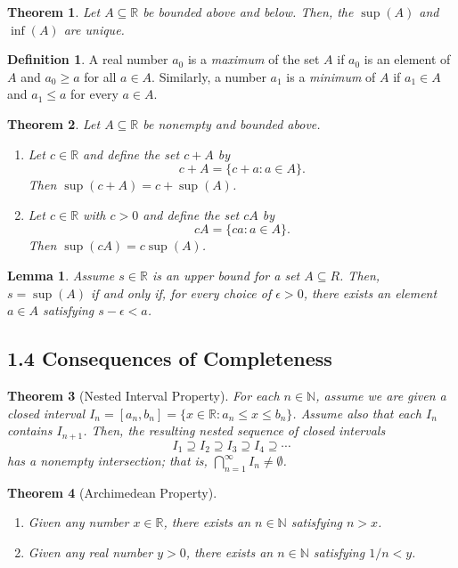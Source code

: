 \documentclass[11pt]{amsart}
\newtheorem*{theorem}{Theorem}
\newtheorem*{lemma}{Lemma}
\theoremstyle{definition}
\newtheorem*{definition}{Definition}
\newcommand{\N}{\mathbb{N}}
\newcommand{\R}{\mathbb{R}}
\newcommand{\st}{\mathrel{:}}
\begin{document}
\begin{theorem}
  Let $A \subseteq \R$ be bounded above and below. Then, the $\sup(A)$ and
  $\inf(A)$ are unique.
\end{theorem}

\begin{definition}
  A real number $a_0$ is a \emph{maximum} of the set $A$ if $a_0$ is an element
  of $A$ and $a_0 \ge a$ for all $a \in A$. Similarly, a number $a_1$ is a
  \emph{minimum} of $A$ if $a_1 \in A$ and $a_1 \le a$ for every $a \in A$.
\end{definition}

\begin{theorem}
  Let $A \subseteq \R$ be nonempty and bounded above.
  \begin{enumerate}[label={(\roman*)}]
    \item Let $c \in \R$ and define the set $c + A$ by
      \[
        c + A = \{c + a \st a \in A\}.
      \]
      Then $\sup(c + A) = c + \sup(A)$.
    \item Let $c \in \R$ with $c > 0$ and define the set $cA$ by
      \[
        cA = \{ca \st a \in A\}.
      \]
      Then $\sup(cA) = c \sup(A)$.
  \end{enumerate}
\end{theorem}

\begin{lemma}
  Assume $s \in \R$ is an upper bound for a set $A \subseteq R$. Then, $s =
  \sup(A)$ if and only if, for every choice of $\epsilon > 0$, there exists an
  element $a \in A$ satisfying $s - \epsilon < a$.
\end{lemma}

\subsection*{1.4 Consequences of Completeness}

\begin{theorem}[Nested Interval Property]
  For each $n \in \N$, assume we are given a closed interval $I_n = [a_n, b_n] =
  \{x \in \R \st a_n \le x \le b_n\}$. Assume also that each $I_n$ contains
  $I_{n+1}$. Then, the resulting nested sequence of closed intervals
  \[
    I_1 \supseteq I_2 \supseteq I_3 \supseteq I_4 \supseteq \cdots
  \]
  has a nonempty intersection; that is, $\bigcap_{n=1}^{\infty} I_n \neq
  \emptyset$.
\end{theorem}

\begin{theorem}[Archimedean Property]
  \begin{enumerate}[label={(\roman*)}]
    \item Given any number $x \in \R$, there exists an $n \in \N$ satisfying $n
      > x$.
    \item Given any real number $y > 0$, there exists an $n \in \N$ satisfying
      $1/n < y$.
  \end{enumerate}
\end{theorem}
\end{document}
